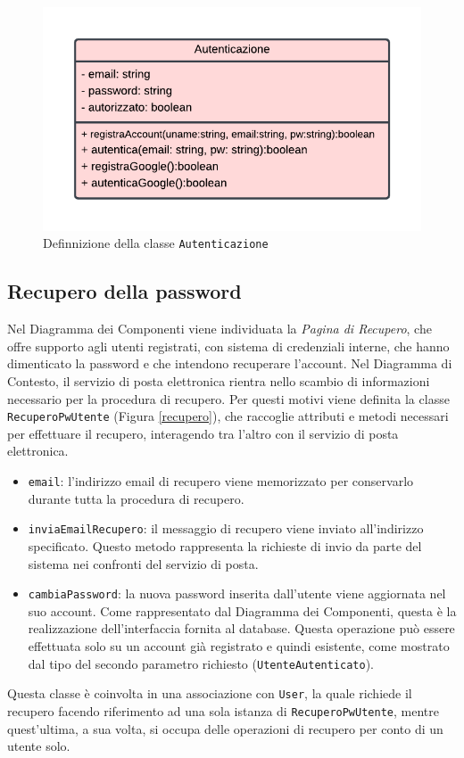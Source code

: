 \documentclass[11pt, a4paper]{article}
\theoremstyle{definition} %
\begin{document}
\begin{figure}[H]
\centering
\includegraphics[scale = 0.9]{materiale/class-autenticazione.pdf}
\caption{Definnizione della classe \texttt{Autenticazione}}
\label{autenticaz}
\end{figure}

\newpage
\subsection{Recupero della password}
Nel Diagramma dei Componenti viene individuata la \textit{Pagina di Recupero},
che offre supporto agli utenti registrati, con sistema di credenziali interne,
che hanno dimenticato la password e che intendono recuperare l'account.
Nel Diagramma di Contesto, il servizio di posta elettronica rientra nello
scambio di informazioni necessario per la procedura di recupero. Per
questi motivi viene definita la classe \texttt{RecuperoPwUtente} (Figura \ref{recupero}), che
raccoglie attributi e metodi necessari per effettuare il recupero,
interagendo tra l'altro con il servizio di posta elettronica.

\begin{itemize}
    \item \texttt{email}: l'indirizzo email di recupero viene memorizzato
    per conservarlo durante tutta la procedura di recupero.

    \item \texttt{inviaEmailRecupero}: il messaggio di recupero viene inviato
    all'indirizzo specificato. Questo metodo rappresenta la richieste di
    invio da parte del sistema nei confronti del servizio di posta.

    \item \texttt{cambiaPassword}: la nuova password inserita dall'utente
    viene aggiornata nel suo account. Come rappresentato dal Diagramma dei
    Componenti, questa è la realizzazione dell'interfaccia fornita al
    database. Questa operazione può essere effettuata solo su un account
    già registrato e quindi esistente, come mostrato dal tipo del secondo
    parametro richiesto (\texttt{UtenteAutenticato}).
\end{itemize}
Questa classe è coinvolta in una associazione con \texttt{User}, la quale
richiede il recupero facendo riferimento ad una sola istanza di
\texttt{RecuperoPwUtente}, mentre quest'ultima, a sua volta, si occupa
delle operazioni di recupero per conto di un utente solo.
\end{document}
